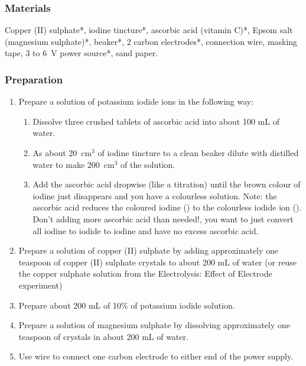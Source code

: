 \subsubsection*{Materials}
Copper (II) sulphate*, iodine tincture*, ascorbic acid (vitamin C)*, Epsom salt (magnesium sulphate)*, beaker*, 2 carbon electrodes*, connection wire, masking tape, 3 to 6~V power source*, sand paper.

\subsubsection*{Preparation}
\begin{enumerate}
\item{Prepare a solution of potassium iodide ions in the following way:
\begin{enumerate}
\item{Dissolve three crushed tablets of ascorbic acid into about 100 mL of water.}
\item{As about 20~cm$^{3}$ of iodine tincture to a clean beaker dilute with distilled water to make 200~cm$^{3}$ of the solution.}
\item{ Add the ascorbic acid dropwise (like a titration) until the brown colour of iodine just disappears and you have a colourless solution.} Note: the ascorbic acid reduces the coloured iodine () to the colourless iodide ion (). Don't adding more ascorbic acid than needed!, you want to just convert all iodine to iodide to iodine and have no excess ascorbic acid.
\end{enumerate}}

\item{Prepare a solution of copper (II) sulphate by adding approximately one teaspoon of copper (II) sulphate crystals to about 200 mL of water (or reuse the copper sulphate solution from the Electrolysis: Effect of Electrode experiment)}
\item{Prepare about 200 mL of 10\% of potassium iodide solution.}
\item{Prepare a solution of magnesium sulphate by dissolving approximately one teaspoon of crystals in about 200 mL of water.}
\item{Use wire to connect one carbon electrode to either end of the power supply.}
\end{enumerate}

